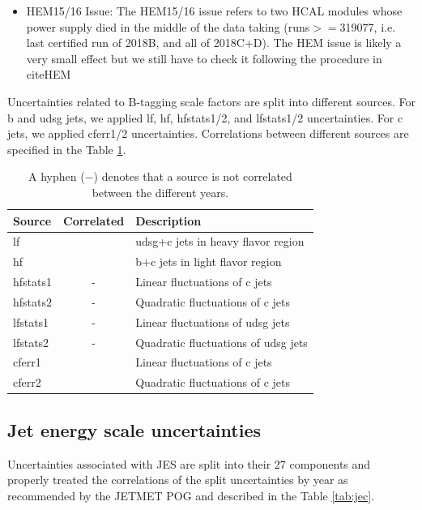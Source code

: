 \begin{itemize}
\item HEM15/16 Issue: The HEM15/16 issue refers to two HCAL modules whose power supply died in 
the middle of the data taking (runs$>=$319077, i.e. last certified run of 
2018B, and all of 2018C+D). The HEM issue is likely a very small effect but we still have to check it following the procedure in cite{HEM}
\end{itemize}

Uncertainties related to B-tagging scale factors are split into different sources. For b and udsg jets, we applied lf, hf, hfstats1/2, and lfstats1/2 uncertainties. For c jets, we applied cferr1/2 uncertainties. Correlations between different sources are specified in the Table \ref{tab:btag}.

\begin{table}[!hbtp]
\label{tab:btag}
\sffamily
\begin{center}
\caption{
A hyphen ($-$) denotes that a source is not correlated between the different years.
}
\begin{tabular}{|l|c|l|}
\hline
Source & Correlated & Description\\
\hline
lf			& \checkmark & udsg+c jets in heavy flavor region\\ %
hf			& \checkmark & b+c jets in light flavor region \\ %
hfstats1	& - 		 & Linear fluctuations of c jets\\
hfstats2	& -			 & Quadratic fluctuations of c jets \\
lfstats1	& -			 & Linear fluctuations of udsg jets \\
lfstats2	& -			 & Quadratic fluctuations of udsg jets \\
cferr1		& \checkmark & Linear fluctuations of c jets \\
cferr2		& \checkmark & Quadratic fluctuations of c jets \\
\hline
\end{tabular}
\end{center}
\end{table}

\subsection{Jet energy scale uncertainties}

Uncertainties associated with JES are split into their 27 components and properly treated the correlations of the split uncertainties by year as recommended by the JETMET POG and described in the Table \ref{tab:jec}.

